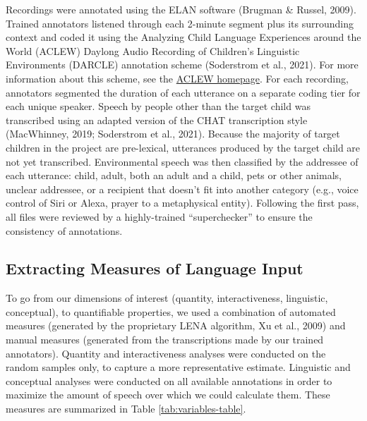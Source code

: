 \documentclass[
  man]{apa6}
\begin{document}
Recordings were annotated using the ELAN software (Brugman \& Russel, 2009). Trained annotators listened through each 2-minute segment plus its surrounding context and coded it using the Analyzing Child Language Experiences around the World (ACLEW) Daylong Audio Recording of Children's Linguistic Environments (DARCLE) annotation scheme (Soderstrom et al., 2021). For more information about this scheme, see the \href{https://sites.google.com/view/aclewdid/home}{ACLEW homepage}. For each recording, annotators segmented the duration of each utterance on a separate coding tier for each unique speaker. Speech by people other than the target child was transcribed using an adapted version of the CHAT transcription style (MacWhinney, 2019; Soderstrom et al., 2021). Because the majority of target children in the project are pre-lexical, utterances produced by the target child are not yet transcribed. Environmental speech was then classified by the addressee of each utterance: child, adult, both an adult and a child, pets or other animals, unclear addressee, or a recipient that doesn't fit into another category (e.g., voice control of Siri or Alexa, prayer to a metaphysical entity). Following the first pass, all files were reviewed by a highly-trained ``superchecker'' to ensure the consistency of annotations.

\hypertarget{extracting-measures-of-language-input}{%
\subsection{Extracting Measures of Language Input}\label{extracting-measures-of-language-input}}

To go from our dimensions of interest (quantity, interactiveness, linguistic, conceptual), to quantifiable properties, we used a combination of automated measures (generated by the proprietary LENA algorithm, Xu et al., 2009) and manual measures (generated from the transcriptions made by our trained annotators). Quantity and interactiveness analyses were conducted on the random samples only, to capture a more representative estimate. Linguistic and conceptual analyses were conducted on all available annotations in order to maximize the amount of speech over which we could calculate them. These measures are summarized in Table \ref{tab:variables-table}.
\end{document}
